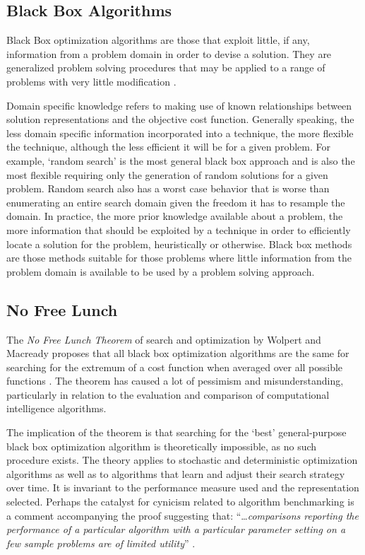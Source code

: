 % 
% 
\subsection{Black Box Algorithms}
\label{subsec:black_box}
Black Box optimization algorithms are those that exploit little, if any, information from a problem domain in order to devise a solution. They are generalized problem solving procedures that may be applied to a range of problems with very little modification \cite{Droste2006}.

Domain specific knowledge refers to making use of known relationships between solution representations and the objective cost function. Generally speaking, the less domain specific information incorporated into a technique, the more flexible the technique, although the less efficient it will be for a given problem. For example, `random search' is the most general black box approach and is also the most flexible requiring only the generation of random solutions for a given problem. Random search also has a worst case behavior that is worse than enumerating an entire search domain given the freedom it has to resample the domain. In practice, the more prior knowledge available about a problem, the more information that should be exploited by a technique in order to efficiently locate a solution for the problem, heuristically or otherwise. Black box methods are those methods suitable for those problems where little information from the problem domain is available to be used by a problem solving approach.  

% 
% 
\subsection{No Free Lunch}
\label{subsec:nfl}
The \emph{No Free Lunch Theorem} of search and optimization by Wolpert and Macready proposes that all black box optimization algorithms are the same for searching for the extremum of a cost function when averaged over all possible functions \cite{Wolpert1997, Wolpert1995}. The theorem has caused a lot of pessimism and misunderstanding, particularly in relation to the evaluation and comparison of computational intelligence algorithms.

The implication of the theorem is that searching for the `best' general-purpose black box optimization algorithm is theoretically impossible, as no such procedure exists. The theory applies to stochastic and deterministic optimization algorithms as well as to algorithms that learn and adjust their search strategy over time. It is invariant to the performance measure used and the representation selected. Perhaps the catalyst for cynicism related to algorithm benchmarking is a comment accompanying the proof suggesting that: ``\ldots \emph{comparisons reporting the performance of a particular algorithm with a particular parameter setting on a few sample problems are of limited utility}'' \cite{Wolpert1997}.

